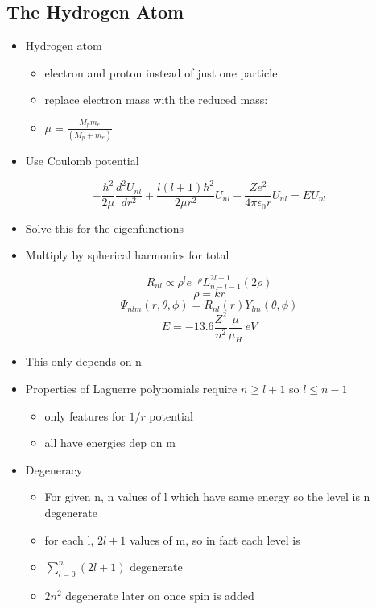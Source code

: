 \documentclass[a4paper,11pt,normalem]{article}
\begin{document}
\subsection{The Hydrogen Atom}\label{the-hydrogen-atom}
\begin{itemize}
\item
  Hydrogen atom
  \begin{itemize}
  \item
    electron and proton instead of just one particle
  \item
    replace electron mass with the reduced mass:
  \item
    \(\mu = \frac{M_p m_e}{(M_p + m_e)}\)
  \end{itemize}
\item
  Use Coulomb potential
\end{itemize}
\[
    -\frac{\hbar^2}{2\mu}\frac{d^2 U_{nl}}{dr^2} + \frac{l(l + 1)\hbar^2}{2\mu r^2}U_{nl} - \frac{Ze^2}{4\pi\epsilon_{0} r}U_{nl} = EU_{nl}
\]
\begin{itemize}
\item
  Solve this for the eigenfunctions
\item
  Multiply by spherical harmonics for total
\end{itemize}
\[
    R_{nl} \propto \rho^{l} e^{-\rho} L_{n - l - 1}^{2l + 1}(2\rho) \]
\[
    \rho = kr \] \[
    \Psi_{nlm}(r,\theta,\phi) = R_{nl}(r)Y_{lm}(\theta,\phi) \] \[
    E = -13.6\frac{Z^2}{n^2}\frac{\mu}{\mu_{H}}\,eV
\]
\begin{itemize}
\item
  This only depends on n
\item
  Properties of Laguerre polynomials require \(n \geq l + 1\) so
  \(l \leq n - 1\)
  \begin{itemize}
  \item
    only features for \(1/r\) potential
  \item
    all have energies dep on m
  \end{itemize}
\item
  Degeneracy
  \begin{itemize}
  \item
    For given n, n values of l which have same energy so the level is n
    degenerate
  \item
    for each l, \(2l + 1\) values of m, so in fact each level is
  \item
    \(\sum_{l = 0}^{n} (2l + 1)\) degenerate
  \item
    \(2n^2\) degenerate later on once spin is added
  \end{itemize}
\end{itemize}
\end{document}
